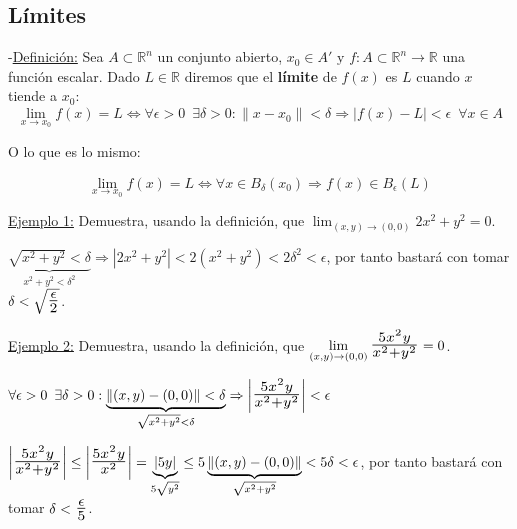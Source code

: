 \documentclass[10pt, titlepage]{article}
\newcommand{\R}{\mathbb{R}}
\newcommand{\bfrac}[2]{\scalebox{1.4}{$\frac{#1}{#2}$}}
\newcommand{\spac}{\, \, \,}
\newcommand{\definicion}{\noindent-\underline{Definición:} }
\newcommand{\dindent}{\indent\indent}
\begin{document}

\subsection{Límites}
\vspace{5mm}

\definicion Sea $A  \subset \R^n$ un conjunto abierto, $x_0 \in A' \text{ y } f : A \subset \R^n \to \R$ una
función escalar. Dado $L \in \R$ diremos que el \textbf{límite} de $f (x)$ es $L$ cuando $x$ tiende a $x_0$:
\[
\boxed{
\displaystyle \lim_ {x \to x_0}^{} f(x) = L \iff \forall{\epsilon > 0} \spac \exists{\delta > 0} : 
 \|x - x_0\| < \delta \Rightarrow |f (x) - L| < \epsilon \spac \forall{x \in A}
}
\]
\vspace{3mm}

O lo que es lo mismo:

\[
\boxed{
\displaystyle \lim_{x \to x_0}^{} f (x) =L \iff \forall{x \in B_\delta (x_0)} \Rightarrow f (x) \in B_\epsilon(L)
}
\]
\vspace{3mm}

\underline{Ejemplo 1:} Demuestra, usando la definición, que $\displaystyle \lim_{(x, y) \to (0, 0)} 2x^2 + 
y^2 = 0$.
\vspace{3mm}

\dindent{$\forall{\epsilon > 0} \spac \exists \delta > 0 : \| (x, y) - (0, 0) \| < \delta \Rightarrow 
| (2x^2 + y^2) - 0 | < \epsilon$}
\vspace{3mm}

\dindent$\underbrace{\sqrt{x^2 + y^2} < \delta}_{x^2 + y^2 < \delta^2} \Rightarrow | 2x^2 + 
y^2 | < 2 (x^2 + y^2) < 2\delta^2 < \epsilon$, por tanto bastará con tomar $\delta <
\sqrt{\bfrac{\epsilon}{2}}$.
\vspace{5mm}

\underline{Ejemplo 2:} Demuestra, usando la definición, que $\displaystyle \lim_{ (x, y) \to (0, 0) } 
\bfrac{5x^2y}{x^2 + y^2} =0$.
\vspace{3mm}

\dindent $\forall{\epsilon > 0} \spac \exists{\delta > 0} : \underbrace{\| (x, y) - (0, 0) \| < \delta}_
{\sqrt{x^2 + y^2} < \delta} \Rightarrow \left | \bfrac{5x^2y}{x^2 + y^2} \right |< \epsilon$
\vspace{3mm}

\dindent$\left |\bfrac{5x^2 y}{x^2 + y^2} \right | \leq \left | \bfrac{5x^2 y}{x^2} \right | =  
\underbrace{|5 y|}_{5 \sqrt{y^2}} \leq 5 \underbrace {\|(x, y) - (0, 0)\|}_{\sqrt{x^2 + y^2}} < 5 \delta < 
\epsilon$, por tanto bastará con tomar $\delta < \bfrac{\epsilon}{5}$.
\vspace{7mm}
\end{document}
